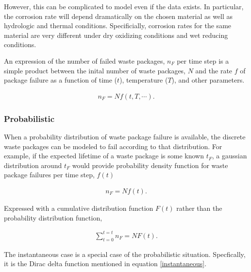 {However, this can be complicated to model even if the data exists. In
particular, the corrosion rate will depend dramatically on the chosen material 
as well as hydrologic and
thermal conditions. Specificially, corrosion rates for the same material are
very different under dry oxidizing conditions and wet reducing conditions. 


An expression of the number of failed waste packages, $n_F$ per time step is a simple 
product between the inital number of waste packages, $N$ and the rate $f$ of
package  failure as a function of time ($t$), temperature ($T$), and other 
parameters.

\begin{align}
  n_F = Nf(t,T,\cdots).
  \label{rate}
\end{align}

\subsubsection{Probabilistic}

When a probability distribution of waste package failure is available, the 
discrete waste packages can be modeled to fail according to that distribution. 
For example, if the expected lifetime of a waste package is some known $t_F$, a 
gaussian distribution around $t_F$ would provide probability density function 
for waste package failures per time step, $f(t)$

\begin{align}
  n_F=Nf(t).
  \label{probabilistic}
\end{align}

Expressed with a cumulative distribution function $F(t)$ rather than the
probability distribution function, 


\begin{align}
  \sum_{t=0}^{t=t}n_F=NF(t).
  \label{cdf}
\end{align}

The instantaneous case is a special case of the probabilistic situation. 
Specfically, it is the Dirac delta function mentioned in equation 
\eqref{instantaneous}.

}
